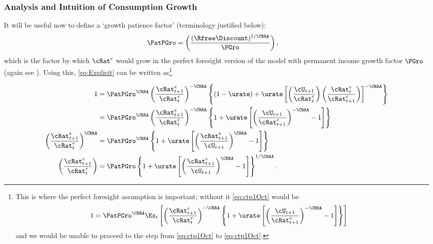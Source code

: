 \documentclass{\handout}
\begin{document}
\subsubsection{Analysis and Intuition of Consumption Growth}
It will be useful now to define a `growth patience factor' (terminology justified below):
\begin{equation}\begin{gathered}\begin{aligned}
  \PatPGro & =  \left(\frac{(\Rfree\Discount)^{1/\CRRA}}{\PGro}\right), \label{eq:PatPGro}
\end{aligned}\end{gathered}\end{equation}
which is the factor by which ${\cRat}^{e}$ would grow in the
perfect foresight version of the model with permanent income growth factor
$\PGro$ (again see ).  
Using this,
\eqref{eq:Explicit} can be written as\footnote{This is where the perfect foresight assumption is important; without it \eqref{eq:ctp1Oct} would be 
\begin{equation}\begin{gathered}\begin{aligned}
 1       & =  \PatPGro^{\CRRA} \Ex_{t}\left[\left(\frac{{\cRat}^{e}_{t+1}}{{\cRat}^{e}_{t}}\right)^{-\CRRA} \left\{1+\urate\left[\left(\frac{\cU_{t+1}}{{\cRat}^{e}_{t+1}}\right)^{-\CRRA}-1\right]\right\}\right] \label{eq:BeforePFStepWithEx}
\end{aligned}\end{gathered}\end{equation}
and we would be unable to proceed to the step from \eqref{eq:ctp1Oct} to \eqref{eq:ctp1Oct}.}

\begin{equation}\begin{gathered}\begin{aligned}
        1  & = \PatPGro^{\CRRA} \left(\frac{{\cRat}^{e}_{t+1}}{{\cRat}^{e}_{t}}\right)^{-\CRRA} \left\{(1-\urate)+\urate\left[\left(\frac{\cU_{t+1}}{{\cRat}^{e}_{t}}\right)\left(\frac{{\cRat}^{e}_{t}}{{\cRat}^{e}_{t+1}}\right)\right]^{-\CRRA}\right\} \notag
\\       & = \PatPGro^{\CRRA} \left(\frac{{\cRat}^{e}_{t+1}}{{\cRat}^{e}_{t}}\right)^{-\CRRA} \left\{1+\urate\left[\left(\frac{\cU_{t+1}}{{\cRat}^{e}_{t+1}}\right)^{-\CRRA}-1\right]\right\} \notag %
\\       \left(\frac{{\cRat}^{e}_{t+1}}{{\cRat}^{e}_{t}}\right)^{\CRRA} & = \PatPGro^{\CRRA} \left\{1+\urate\left[\left(\frac{{\cRat}^{e}_{t+1}}{\cU_{t+1}}\right)^{\CRRA}-1\right]\right\} \label{eq:ctp1Oct} 
\\       \left(\frac{{\cRat}^{e}_{t+1}}{{\cRat}^{e}_{t}}\right) & = {\PatPGro} \left\{1+\urate\left[\left(\frac{{\cRat}^{e}_{t+1}}{\cU_{t+1}}\right)^{\CRRA}-1\right]\right\}^{1/\CRRA}.  \notag
\end{aligned}\end{gathered}\end{equation}
\end{document}
